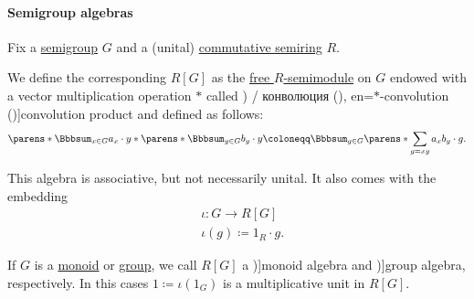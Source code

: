 \paragraph{Semigroup algebras}

\begin{definition}\label{def:semigroup_algebra}
  Fix a \hyperref[def:semigroup]{semigroup} \( G \) and a (unital) \hyperref[def:semiring/commutative]{commutative semiring} \( R \).

  We define the corresponding  \( R[G] \) as the \hyperref[def:free_semimodule]{free \( R \)-semimodule} on \( G \) endowed with a vector multiplication operation \( \ast \) called \term[ru=свёртка (\cite[62]{Боровков1999ТеорияВероятностей}) / конволюция (\cite[179]{ИоффеТихомиров1974ЭкстремальныеЗадачи}), en=\( \ast \)-convolution (\cite[29]{Golan1999Semirings})]{convolution product} and defined as follows:
  \begin{equation}\label{eq:def:semigroup_algebra/multiplication}
    \parens*{ \Bbbsum_{x \in G} a_x \cdot y } \ast \parens*{ \Bbbsum_{y \in G} b_y \cdot y }
    \coloneqq
    \Bbbsum_{g \in G} \parens*{ \sum_{g = xy} a_x b_y } \cdot g.
  \end{equation}

  This algebra is associative, but not necessarily unital. It also comes with the embedding
  \begin{equation}\label{eq:def:semigroup_algebra/embedding}
    \begin{aligned}
      &\iota: G \to R[G] \\
      &\iota(g) \coloneqq 1_R \cdot g.
    \end{aligned}
  \end{equation}

  If \( G \) is a \hyperref[def:monoid]{monoid} or \hyperref[def:group]{group}, we call \( R[G] \) a \term[en=monoid algebra (\cite[445]{Bourbaki1998Algebra1to3})]{monoid algebra} and \term[en=group algebra (\cite[445]{Bourbaki1998Algebra1to3})]{group algebra}, respectively. In this cases \( 1 \coloneqq \iota(1_G) \) is a multiplicative unit in \( R[G] \).
\end{definition}

